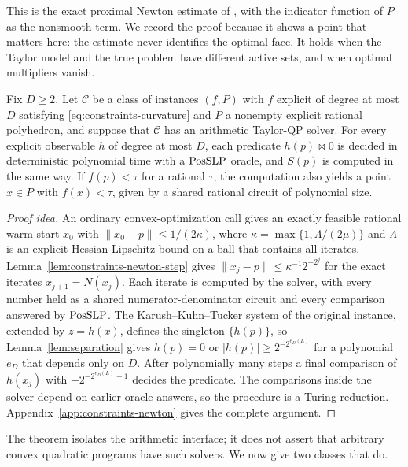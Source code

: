 This is the exact proximal Newton estimate of
\citet[Theorem~3.4]{LeeSunSaunders2014}, with the indicator function of $P$ as
the nonsmooth term. We record the proof because it shows a point that matters
here: the estimate never identifies the optimal face. It holds when the Taylor
model and the true problem have different active sets, and when optimal
multipliers vanish.

\begin{theorem}
\label{thm:constraints-transfer}
Fix $D\ge2$. Let $\mathcal C$ be a class of instances $(f,P)$ with $f$
explicit of degree at most $D$ satisfying \eqref{eq:constraints-curvature}
and $P$ a nonempty explicit rational polyhedron, and suppose that
$\mathcal C$ has an arithmetic Taylor-QP solver. For every explicit observable
$h$ of degree at most $D$, each predicate $h(p)\bowtie0$ is decided in
deterministic polynomial time with a $\mathrm{PosSLP}$ oracle, and $S(p)$ is computed
in the same way. If $f(p)<\tau$ for a rational $\tau$, the computation also
yields a point $x\in P$ with $f(x)<\tau$, given by a shared rational circuit
of polynomial size.
\end{theorem}

\begin{proof}[Proof idea]
An ordinary convex-optimization call gives an exactly feasible rational warm
start $x_0$ with $\|x_0-p\|\le1/(2\kappa)$, where $\kappa=\max\{1,\Lambda/(2\mu)\}$
and $\Lambda$ is an explicit Hessian-Lipschitz bound on a ball that contains
all iterates. Lemma~\ref{lem:constraints-newton-step} gives
$\|x_j-p\|\le\kappa^{-1}2^{-2^j}$ for the exact iterates $x_{j+1}=N(x_j)$.
Each iterate is computed by the solver, with every number held as a shared
numerator-denominator circuit and every comparison answered by $\mathrm{PosSLP}$.
The Karush--Kuhn--Tucker system of the original instance, extended by
$z=h(x)$, defines the singleton $\{h(p)\}$, so Lemma~\ref{lem:separation}
gives $h(p)=0$ or $|h(p)|\ge2^{-2^{e_D(L)}}$ for a polynomial $e_D$ that
depends only on $D$. After polynomially many steps a final comparison of
$h(x_j)$ with $\pm2^{-2^{e_D(L)}-1}$ decides the predicate.
The comparisons inside the solver depend on earlier oracle answers, so the
procedure is a Turing reduction. Appendix~\ref{app:constraints-newton} gives
the complete argument.
\end{proof}

The theorem isolates the arithmetic interface; it does not assert that
arbitrary convex quadratic programs have such solvers. We now give two classes
that do.

